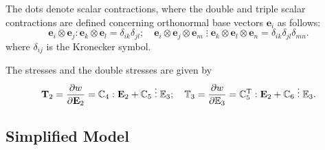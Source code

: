 The dots denote scalar contractions, where the double and triple scalar contractions are defined concerning orthonormal base vectors ${{\mathbf e}}_i$ as follows:
\begin{equation} \label{Chirkov_Eq_6_} 
	{{\mathbf e}}_i\otimes {{\mathbf e}}_j:{{\mathbf e}}_k\otimes {{\mathbf e}}_l=\delta_{ik}\delta_{jl};\quad  {{\mathbf e}}_i\otimes {{\mathbf e}}_j\otimes {{\mathbf e}}_m\;\vdots\; {{\mathbf e}}_k\otimes {{\mathbf e}}_l\otimes {{\mathbf e}}_n=\delta_{ik}\delta_{jl}\delta_{mn}.     
\end{equation} 
where $\delta_{ij}$ is the Kronecker symbol. 

The stresses and the double stresses are given by
\begin{equation} \label{Chirkov_Eq_7_} 
	{{\mathbf T}}_2=\frac{\partial w}{\partial {{\mathbf E}}_2}={\mathbb C}_4:{{\mathbf E}}_2+{{\mathbb C}}_5\;\vdots\; {{\mathbb E}}_3;
	\quad
	{{\mathbb T}}_3=\frac{\partial w}{\partial {{\mathbb E}}_3}={{\mathbb C}}^{{\rm T}}_5:{{\mathbf E}}_2+{{\mathbb C}}_6\;\vdots\; {{\mathbb E}}_3. 
\end{equation} 



\subsection{Simplified Model}


